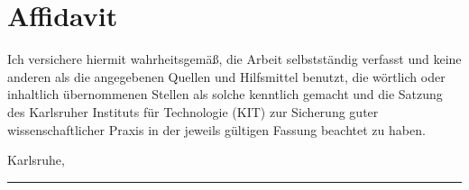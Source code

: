 
\chapter{Affidavit}
\label{ch:Affidavit}

Ich versichere hiermit wahrheitsgemäß, die Arbeit selbstständig verfasst und keine anderen als die
angegebenen Quellen und Hilfsmittel benutzt, die wörtlich oder inhaltlich übernommenen Stellen als
solche kenntlich gemacht und die Satzung des Karlsruher Instituts für Technologie (KIT) zur
Sicherung guter wissenschaftlicher Praxis in der jeweils gültigen Fassung beachtet zu haben.

\vspace*{1cm}
\begin{flushright}
	Karlsruhe, \submissiontime \hspace*{0.5cm} \rule{0.4\textwidth}{0.5pt} \\
	\myname \hspace*{1.3cm}
\end{flushright}

